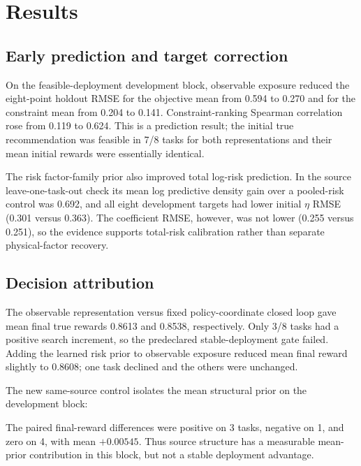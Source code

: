 \section{Results}\label{sec:mp_results}

\subsection{Early prediction and target correction}

On the feasible-deployment development block, observable exposure reduced the
eight-point holdout RMSE for the objective mean from 0.594 to 0.270 and for the
constraint mean from 0.204 to 0.141.  Constraint-ranking Spearman correlation
rose from 0.119 to 0.624.  This is a prediction result; the initial true
recommendation was feasible in 7/8 tasks for both representations and their
mean initial rewards were essentially identical.

The risk factor-family prior also improved total log-risk prediction.  In the
source leave-one-task-out check its mean log predictive density gain over a
pooled-risk control was 0.692, and all eight development targets had lower
initial $\eta$ RMSE (0.301 versus 0.363).  The coefficient RMSE, however, was
not lower (0.255 versus 0.251), so the evidence supports total-risk calibration
rather than separate physical-factor recovery.

\subsection{Decision attribution}

The observable representation versus fixed policy-coordinate closed loop gave
mean final true rewards 0.8613 and 0.8538, respectively.  Only 3/8 tasks had a
positive search increment, so the predeclared stable-deployment gate failed.
Adding the learned risk prior to observable exposure reduced mean final reward
slightly to 0.8608; one task declined and the others were unchanged.

The new same-source control isolates the mean structural prior on the
development block:
\begin{table}[t]
\centering
\caption{Paired source-structure attribution on the eight-task development block.}
\label{tab:mp_structure_control}

\end{table}

The paired final-reward differences were positive on 3 tasks, negative on 1,
and zero on 4, with mean $+0.00545$.  Thus source structure has a measurable
mean-prior contribution in this block, but not a stable deployment advantage.

